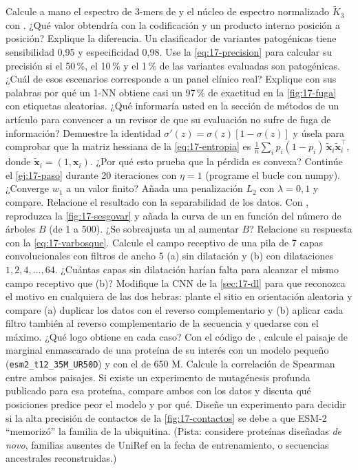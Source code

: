 \begin{ejercicios}
 Calcule a mano el espectro de 3-mers de  y el núcleo de espectro normalizado $\tilde K_3$ con . ¿Qué valor obtendría con la codificación  y un producto interno posición a posición? Explique la diferencia.
 Un clasificador de variantes patogénicas tiene sensibilidad 0,95 y especificidad 0,98. Use la \cref{eq:17-precision} para calcular su precisión si el 50\,\%, el 10\,\% y el 1\,\% de las variantes evaluadas son patogénicas. ¿Cuál de esos escenarios corresponde a un panel clínico real?
 Explique con sus palabras por qué un 1-NN obtiene casi un 97\,\% de exactitud en la \cref{fig:17-fuga} con etiquetas aleatorias. ¿Qué informaría usted en la sección de métodos de un artículo para convencer a un revisor de que su evaluación no sufre de fuga de información?
 Demuestre la identidad $\sigma'(z)=\sigma(z)[1-\sigma(z)]$ y úsela para comprobar que la matriz hessiana de la \cref{eq:17-entropia} es $\frac1n\sum_i p_i(1-p_i)\,\tilde{\mathbf{x}}_i\tilde{\mathbf{x}}_i^\top$, donde $\tilde{\mathbf{x}}_i=(1,\mathbf{x}_i)$. ¿Por qué esto prueba que la pérdida es convexa?
 Continúe el \cref{ej:17-paso} durante 20 iteraciones con $\eta=1$ (programe el bucle con numpy). ¿Converge $w_1$ a un valor finito? Añada una penalización $L_2$ con $\lambda=0{,}1$ y compare. Relacione el resultado con la separabilidad de los datos.
 Con , reproduzca la \cref{fig:17-sesgovar} y añada la curva de un  en función del número de árboles $B$ (de 1 a 500). ¿Se sobreajusta un  al aumentar $B$? Relacione su respuesta con la \cref{eq:17-varbosque}.
 Calcule el campo receptivo de una pila de 7 capas convolucionales con filtros de ancho 5 (a) sin dilatación y (b) con dilataciones $1,2,4,\dots,64$. ¿Cuántas capas sin dilatación harían falta para alcanzar el mismo campo receptivo que (b)?
 Modifique la CNN de la \cref{sec:17-dl} para que reconozca el motivo en cualquiera de las dos hebras: plante el sitio en orientación aleatoria y compare (a) duplicar los datos con el reverso complementario y (b) aplicar cada filtro también al reverso complementario de la secuencia y quedarse con el máximo. ¿Qué logo obtiene en cada caso?
 Con el código de , calcule el paisaje de marginal enmascarado de una proteína de su interés con un modelo pequeño (\texttt{esm2\_\allowbreak t12\_\allowbreak 35M\_\allowbreak UR50D}) y con el de 650 M. Calcule la correlación de Spearman entre ambos paisajes. Si existe un experimento de mutagénesis profunda publicado para esa proteína, compare ambos con los datos y discuta qué posiciones predice peor el modelo y por qué.
 Diseñe un experimento para decidir si la alta precisión de contactos de la \cref{fig:17-contactos} se debe a que ESM-2 ``memorizó'' la familia de la ubiquitina. (Pista: considere proteínas diseñadas \emph{de novo}, familias ausentes de UniRef en la fecha de entrenamiento, o secuencias ancestrales reconstruidas.)
\end{ejercicios}

